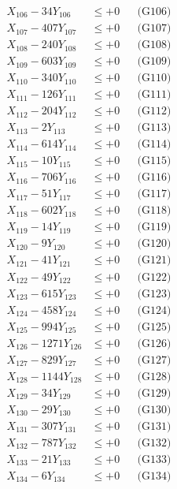 \documentclass[a4paper,10pt]{article}
\begin{document}
{\begin{align}
X_{106} - 34Y_{106} &\leq +0 && \text{(G106)} \\
X_{107} - 407Y_{107} &\leq +0 && \text{(G107)} \\
X_{108} - 240Y_{108} &\leq +0 && \text{(G108)} \\
X_{109} - 603Y_{109} &\leq +0 && \text{(G109)} \\
X_{110} - 340Y_{110} &\leq +0 && \text{(G110)} \\
\allowbreak
X_{111} - 126Y_{111} &\leq +0 && \text{(G111)} \\
X_{112} - 204Y_{112} &\leq +0 && \text{(G112)} \\
X_{113} - 2Y_{113} &\leq +0 && \text{(G113)} \\
X_{114} - 614Y_{114} &\leq +0 && \text{(G114)} \\
X_{115} - 10Y_{115} &\leq +0 && \text{(G115)} \\
X_{116} - 706Y_{116} &\leq +0 && \text{(G116)} \\
X_{117} - 51Y_{117} &\leq +0 && \text{(G117)} \\
X_{118} - 602Y_{118} &\leq +0 && \text{(G118)} \\
X_{119} - 14Y_{119} &\leq +0 && \text{(G119)} \\
X_{120} - 9Y_{120} &\leq +0 && \text{(G120)} \\
\allowbreak
X_{121} - 41Y_{121} &\leq +0 && \text{(G121)} \\
X_{122} - 49Y_{122} &\leq +0 && \text{(G122)} \\
X_{123} - 615Y_{123} &\leq +0 && \text{(G123)} \\
X_{124} - 458Y_{124} &\leq +0 && \text{(G124)} \\
X_{125} - 994Y_{125} &\leq +0 && \text{(G125)} \\
X_{126} - 1271Y_{126} &\leq +0 && \text{(G126)} \\
X_{127} - 829Y_{127} &\leq +0 && \text{(G127)} \\
X_{128} - 1144Y_{128} &\leq +0 && \text{(G128)} \\
X_{129} - 34Y_{129} &\leq +0 && \text{(G129)} \\
X_{130} - 29Y_{130} &\leq +0 && \text{(G130)} \\
\allowbreak
X_{131} - 307Y_{131} &\leq +0 && \text{(G131)} \\
X_{132} - 787Y_{132} &\leq +0 && \text{(G132)} \\
X_{133} - 21Y_{133} &\leq +0 && \text{(G133)} \\
X_{134} - 6Y_{134} &\leq +0 && \text{(G134)} \\

\end{align}}
\end{document}
